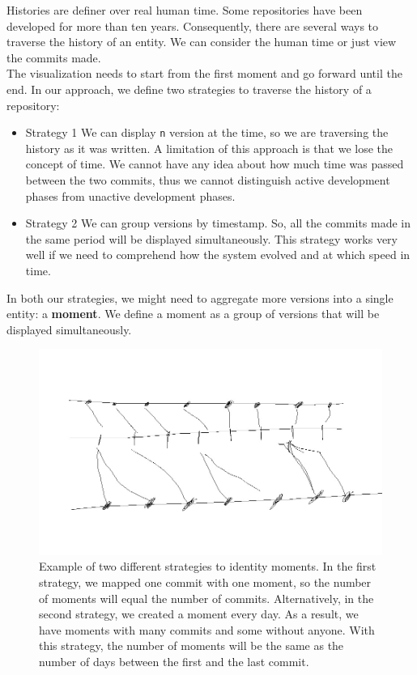 Histories are definer over real human time. Some repositories have been developed for more than ten years. 
Consequently, there are several ways to traverse the history of an entity. 
We can consider the human time or just view the commits made. \\
\bigbreak
The visualization needs to start from the first moment and go forward until the end. 
In our approach, we define two strategies to traverse the history of a repository:
\begin{itemize}
    \item{Strategy 1} We can display \texttt{n} version at the time, so we are traversing the history as it was written. 
    A limitation of this approach is that we lose the concept of time. 
    We cannot have any idea about how much time was passed between the two commits, 
    thus we cannot distinguish active development phases from unactive development phases. 

    \item{Strategy 2} We can group versions by timestamp. 
    So, all the commits made in the same period will be displayed simultaneously. 
    This strategy works very well if we need to comprehend how the system evolved and at which speed in time. 
\end{itemize}

In both our strategies, we might need to aggregate more versions into a single entity: a \textbf{moment}. 
We define a moment as a group of versions that will be displayed simultaneously. 

\begin{figure}[H]
    \begin{center}
        \includegraphics[width=0.9\linewidth]{Moments.jpg} 
        \caption{Example of two different strategies to identity moments. 
        In the first strategy, we mapped one commit with one moment, so the number of moments will equal the number of commits.  
        Alternatively, in the second strategy, we created a moment every day.
        As a result, we have moments with many commits and some without anyone.
        With this strategy, the number of moments will be the same as the number of days between the first and the last commit. 
        }
        \label{fig:moment}
    \end{center}
\end{figure}

